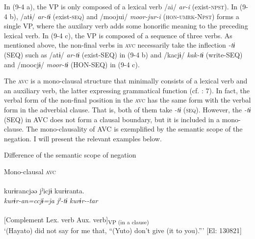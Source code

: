 In (9-4 a), the VP is only composed of a lexical verb /ai/ \textit{ar-i} (exist-\textsc{npst}). In (9-4 b), /atɨ/ \textit{ar-tɨ} (exist-\textsc{seq}) and /moojui/ \textit{moor-jur-i} (\textsc{hon}-\textsc{umrk}-N\textsc{pst}) forms a single VP, where the auxilary verb adds some honorific meaning to the preceding lexical verb. In (9-4 c), the VP is composed of a sequence of three verbs. As mentioned above, the non-final verbs in \textsc{avc} necessarily take the inflection \textit{{}-tɨ} (SEQ) such as /atɨ/ \textit{ar-tɨ} (exist-SEQ) in (9-4 b) and /kacjɨ/ \textit{kak-tɨ} (write-SEQ) and /moocjɨ/ \textit{moor-tɨ} (HON-SEQ) in (9-4 c).

  The \textsc{avc} is a mono-clausal structure that minimally consists of a lexical verb and an auxiliary verb, the latter expressing grammatical function (cf. \citealt{Anderson2006}: 7). In fact, the verbal form of the non-final position in the \textsc{avc} has the same form with the verbal form in the adverbial clause. That is, both of them take \textit{{}-tɨ} (\textsc{seq}). However, the \textit{{}-tɨ} (SEQ) in AVC does not form a clausal boundary, but it is included in a mono-clause. The mono-clausality of AVC is exemplified by the semantic scope of the negation. I will present the relevant examples below.

\ea   Difference of the semantic scope of negation \label{ex:9.5}

  \ea\label{ex:9.5a} Mono-clausal \textsc{avc}\\\\
 \gllll  kurɨrancjəə  jˀicjɨ  kurɨranta.\\
    \textit{kurɨr-an=ccjɨ=ja}  \textit{jˀ-tɨ}  \textit{kurɨr--tar}\\
    [give-\textsc{neg}=\textsc{qt}=\textsc{top}  say-\textsc{seq}  \textsc{ben}-NEG-\textsc{pst}]\\
    {[Complement}  {Lex. verb}  {Aux. verb]\textsubscript{VP (in a clause)}}\\
    \glt     ‘(Hayato) did not say for me that, “(Yuto) don’t give (it to you).”’ [El: 130821]

